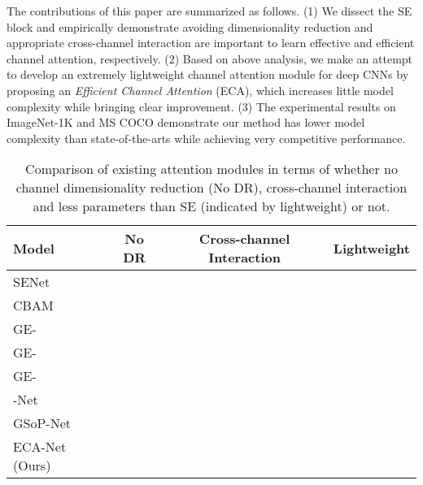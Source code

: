 \documentclass[10pt,twocolumn,letterpaper]{article}
\begin{document}
The contributions of this paper are summarized as follows. (1) We dissect the SE block and empirically demonstrate avoiding dimensionality reduction and appropriate cross-channel interaction are important to learn effective and efficient channel attention, respectively. (2) Based on above analysis, we make an attempt to develop an extremely lightweight channel attention module for deep CNNs by proposing an \emph{Efficient Channel Attention} (ECA), which increases little model complexity while bringing clear improvement. (3) The experimental results on ImageNet-1K and MS COCO demonstrate our method has lower model complexity than state-of-the-arts while achieving very competitive performance.

\begin{table}[t]
	\centering
	\footnotesize
	\smallskip
	\begin{tabular}{l|c|c|c}
		\hline
		Model                              & No DR     & Cross-channel Interaction & Lightweight \\
		\hline
		SENet~\cite{SENet18}               &   &            &     \\
		CBAM~\cite{Woo_2018_ECCV}          &   &            &     \\
		GE- ~\cite{DBLP:conf/nips/HuSASV18}                     &    &           &      \\
		GE-~\cite{DBLP:conf/nips/HuSASV18}                        &    &           &     \\
		GE-~\cite{DBLP:conf/nips/HuSASV18}                        &    &           &     \\
		-Net~\cite{A2NIPS18}        &   &            &     \\
		GSoP-Net~\cite{Gao_2019_CVPR}      &   &            &     \\
		\hline
		ECA-Net (Ours)                            &    &            &     \\
		\hline
	\end{tabular}
	\smallskip
	\caption{Comparison of existing attention modules in terms of whether no channel dimensionality reduction (No DR), cross-channel interaction and less parameters than SE (indicated by lightweight) or not.}
	\label{Atribute}
\end{table}
\end{document}
